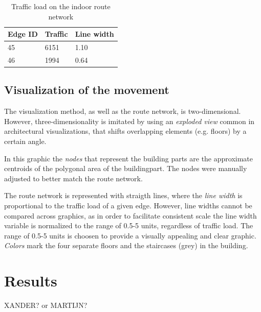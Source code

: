 \begin{table}[H]
\centering
\captionsetup{justification=centering}
\caption{Traffic load on the indoor route network}
\label{table:traffic}
\begin{tabular}{@{}lll@{}}
\toprule
Edge ID & Traffic & Line width \\ \midrule
45      & 6151    & 1.10       \\
46      & 1994    & 0.64       \\ \bottomrule
\end{tabular}
\end{table}


\subsection{Visualization of the movement}
The visualization method, as well as the route network, is two-dimensional.
However, three-dimensionality is imitated by using an \textit{exploded view}
common in architectural visualizations, that shifts overlapping elements (e.g.
floors) by a certain angle.

In this graphic the \textit{nodes} that represent the building parts are the approximate centroids of the polygonal area of the buildingpart. The nodes were manually adjusted
to better match the route network.

The route network is represented with
straigth lines, where the \textit{line width} is proportional to the traffic
load of a given edge. However, line widths cannot be compared across graphics, as in order
to facilitate consistent scale the line width variable is normalized to
the range of 0.5-5 units, regardless of traffic load. The range of 0.5-5 units
is choosen to provide a visually appealing and clear graphic. \textit{Colors}
mark the four separate floors and the staircases (grey) in the building.

\section{Results}

XANDER? or MARTIJN?
